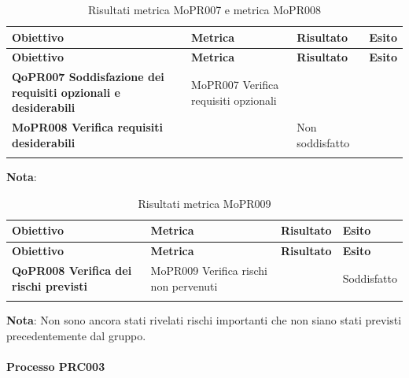\renewcommand{\arraystretch}{2} %
\begin{longtable}[H]{>{\centering\bfseries}m{5cm} >{\centering}m{5cm} >{\centering}m{2.5cm} >{\centering\arraybackslash}m{2.5cm}}  
  \rowcolor{lightgray}
  {\textbf{Obiettivo}} & {\textbf{Metrica}} & {\textbf{Risultato}} & {\textbf{Esito}}  \\
  \endfirsthead%
  \rowcolor{lightgray}
  {\textbf{Obiettivo}} & {\textbf{Metrica}} & {\textbf{Risultato}} & {\textbf{Esito}}  \\
  \endhead%
  \textbf{QoPR007 Soddisfazione dei requisiti opzionali e desiderabili} & MoPR007 Verifica requisiti opzionali \\ MoPR008 Verifica requisiti desiderabili &  & Non soddisfatto \\
  \caption{Risultati metrica MoPR007 e metrica MoPR008}
  \label{tab:my-table}
\end{longtable}
\textbf{Nota}: 

\renewcommand{\arraystretch}{2} %
\begin{longtable}[H]{>{\centering\bfseries}m{5cm} >{\centering}m{5cm} >{\centering}m{2.5cm} >{\centering\arraybackslash}m{2.5cm}}  
  \rowcolor{lightgray}
  {\textbf{Obiettivo}} & {\textbf{Metrica}} & {\textbf{Risultato}} & {\textbf{Esito}}  \\
  \endfirsthead%
  \rowcolor{lightgray}
  {\textbf{Obiettivo}} & {\textbf{Metrica}} & {\textbf{Risultato}} & {\textbf{Esito}}  \\
  \endhead%
  \textbf{QoPR008 Verifica dei rischi previsti} & MoPR009 Verifica rischi non pervenuti & 0 & Soddisfatto \\
  \caption{Risultati metrica MoPR009}
  \label{tab:my-table}
\end{longtable}
\textbf{Nota}: Non sono ancora stati rivelati rischi importanti che non siano stati previsti precedentemente dal gruppo.

\paragraph{Processo PRC003}
\label{sub:processo_PRC003}

